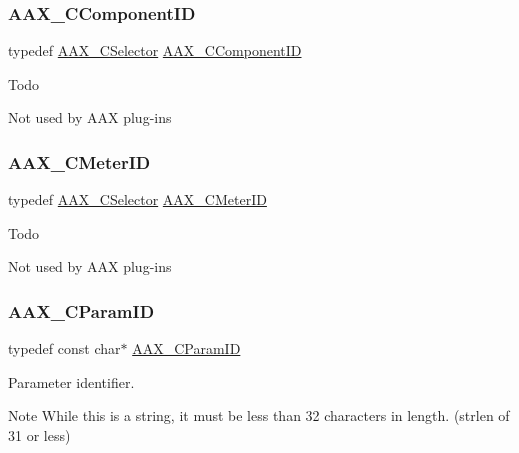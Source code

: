 \subsubsection{\texorpdfstring{AAX\_CComponentID}{AAX\_CComponentID}}
{\footnotesize\ttfamily typedef \mbox{\hyperlink{a00392_aeaf9b387f902c50a8360ff423f4a1f23}{A\+A\+X\+\_\+\+C\+Selector}} \mbox{\hyperlink{a00392_a7e697acf597bd7024de6bb13b9845ce7}{A\+A\+X\+\_\+\+C\+Component\+ID}}}

\begin{DoxyRefDesc}{Todo}
\item[\mbox{\hyperlink{a00785__todo000006}{Todo}}]Not used by A\+AX plug-\/ins \end{DoxyRefDesc}
\mbox{\label{a00392_a6d976263b5f3dd5d01a89d65a3b98ded}} 
\subsubsection{\texorpdfstring{AAX\_CMeterID}{AAX\_CMeterID}}
{\footnotesize\ttfamily typedef \mbox{\hyperlink{a00392_aeaf9b387f902c50a8360ff423f4a1f23}{A\+A\+X\+\_\+\+C\+Selector}} \mbox{\hyperlink{a00392_a6d976263b5f3dd5d01a89d65a3b98ded}{A\+A\+X\+\_\+\+C\+Meter\+ID}}}

\begin{DoxyRefDesc}{Todo}
\item[\mbox{\hyperlink{a00785__todo000007}{Todo}}]Not used by A\+AX plug-\/ins \end{DoxyRefDesc}
\mbox{\label{a00392_a1440c756fe5cb158b78193b2fc1780d1}} 
\subsubsection{\texorpdfstring{AAX\_CParamID}{AAX\_CParamID}}
{\footnotesize\ttfamily typedef const char$\ast$ \mbox{\hyperlink{a00392_a1440c756fe5cb158b78193b2fc1780d1}{A\+A\+X\+\_\+\+C\+Param\+ID}}}



Parameter identifier. 

\begin{DoxyNote}{Note}
While this is a string, it must be less than 32 characters in length. (strlen of 31 or less) 
\end{DoxyNote}
\mbox{\label{a00392_ab4e01b971dac1b25632fd9f710dd8f77}} 
